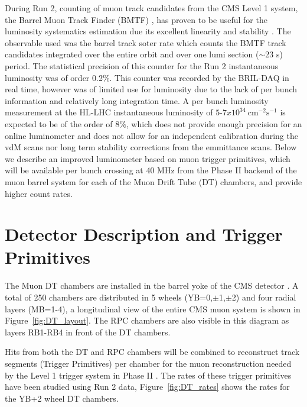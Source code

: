 During Run 2, counting of muon track candidates from the CMS Level 1 system, the Barrel Muon Track Finder (BMTF) ,
has proven to be useful for the luminosity systematics estimation due its excellent linearity and stability \cite{LUM-17-001}.
The observable used was the barrel track soter rate which counts the BMTF track candidates
integrated over the entire orbit and over one lumi section ($\sim$23 s) period.
The statistical precision of this counter for the Run 2 instantaneous luminosity was of order 0.2\%.
This counter was recorded by the BRIL-DAQ in real time, however was of limited use for luminosity due to the
lack of per bunch information and relatively long integration time.
A per bunch luminosity measurement at the HL-LHC instantaneous luminosity of
$5\text{-}7x10^{34}\ \text{cm}^{-2}\text{s}^{-1}$ is expected to be of the order of $8\%$,
which does not provide enough precision for an online luminometer and does not allow for an independent calibration
during the vdM scans nor long term stability corrections from the emmittance scans.
Below we describe an improved luminometer based on muon trigger primitives, which will be available per bunch crossing at 40 MHz
from the Phase II backend of the muon barrel system for each of the Muon Drift Tube (DT) chambers, and provide higher count rates.



\section{Detector Description and Trigger Primitives}

The Muon DT chambers are installed in the barrel yoke of the CMS detector \cite{DT-2009}.
A total of 250 chambers are distributed in 5 wheels (YB=0,$\pm$1,$\pm$2) and four radial layers (MB=1-4),
a longitudinal view of the entire  CMS muon system is shown in Figure~\ref{fig:DT_layout}.
The RPC chambers are also visible in this diagram as layers RB1-RB4 in front of the DT chambers.

Hits from both the DT and RPC chambers will be combined to reconstruct track segments (Trigger Primitives) per chamber for the muon reconstruction needed by the Level 1 trigger system in Phase II \cite{CERN-LHCC-2017-012}.
The rates of these trigger primitives have been studied using Run 2 data, Figure~\ref{fig:DT_rates} shows the rates for the YB+2 wheel DT chambers.



